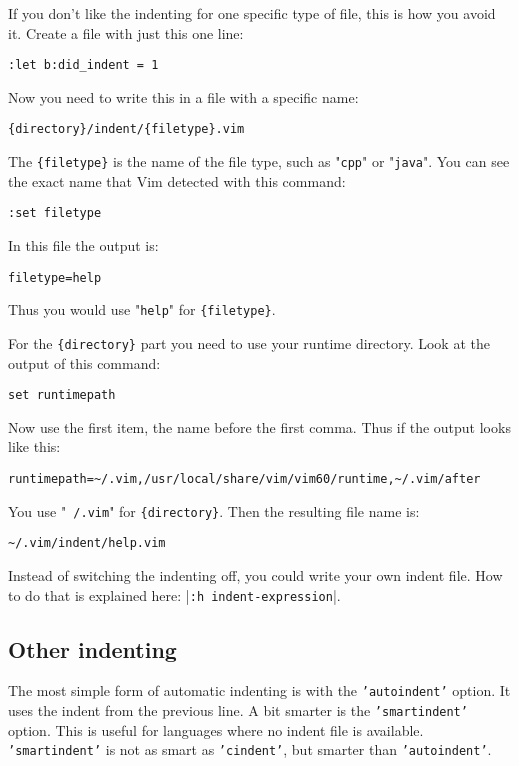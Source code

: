 If you don't like the indenting for one specific type of file, this is how you avoid it.
Create a file with just this one line:

\begin{Verbatim}[samepage=true]
 :let b:did_indent = 1
\end{Verbatim}

Now you need to write this in a file with a specific name:

\begin{Verbatim}[samepage=true]
    {directory}/indent/{filetype}.vim
\end{Verbatim}

The \texttt{\{filetype\}} is the name of the file type, such as "\texttt{cpp}" or "\texttt{java}".
You can see the exact name that Vim detected with this command:

\begin{Verbatim}[samepage=true]
 :set filetype
\end{Verbatim}

In this file the output is:

\begin{Verbatim}[samepage=true]
    filetype=help 
\end{Verbatim}

Thus you would use "\texttt{help}" for \texttt{\{filetype\}}.

For the \texttt{\{directory\}} part you need to use your runtime directory.
Look at the output of this command:

\begin{Verbatim}[samepage=true]
 set runtimepath
\end{Verbatim}

Now use the first item, the name before the first comma.
Thus if the output looks like this:

\begin{Verbatim}[samepage=true]
    runtimepath=~/.vim,/usr/local/share/vim/vim60/runtime,~/.vim/after 
\end{Verbatim}

You use "\texttt{~/.vim}" for \texttt{\{directory\}}.
Then the resulting file name is:

\begin{Verbatim}[samepage=true]
    ~/.vim/indent/help.vim 
\end{Verbatim}

Instead of switching the indenting off, you could write your own indent file.
How to do that is explained here: |\texttt{:h indent-expression}|.
\subsection{Other indenting}
The most simple form of automatic indenting is with the \texttt{'autoindent'} option.
It uses the indent from the previous line.
A bit smarter is the \texttt{'smartindent'} option.
This is useful for languages where no indent file is available.
\texttt{'smartindent'} is not as smart as \texttt{'cindent'}, but smarter than \texttt{'autoindent'}.

